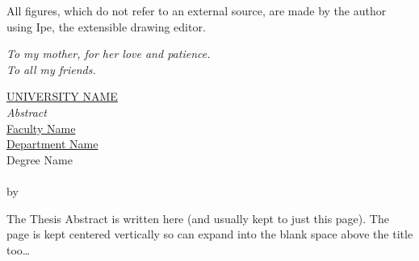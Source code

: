 All figures, which do not refer to an external
source, are made by the author using Ipe, the extensible drawing editor.









































\cleardoublepage
\thispagestyle{empty}
\begin{flushright}
  \itshape
  To my mother, for her love and patience. \\
  To all my friends.
\end{flushright}


\cleardoublepage
\thispagestyle{plain}
\null
\vfill
\begin{center}
  \makeatletter
  \MakeUppercase{\href{https://href.com}{University Name}} \\
  \bigskip
  {\huge\itshape Abstract} \\
  \bigskip
  \href{https://href.com}{Faculty Name} \\
  \href{https://href.com}{Department Name} \\
  \bigskip
  Degree Name \\
  \bigskip
  \textbf{\@title} \\
  \medskip
  by \@author \\
  \bigskip
  \makeatother
\end{center}
{\small The Thesis Abstract is written here (and usually kept to just this
  page). The page is kept centered vertically so can expand into the blank space
  above the title too\ldots}
\vfill
\null


